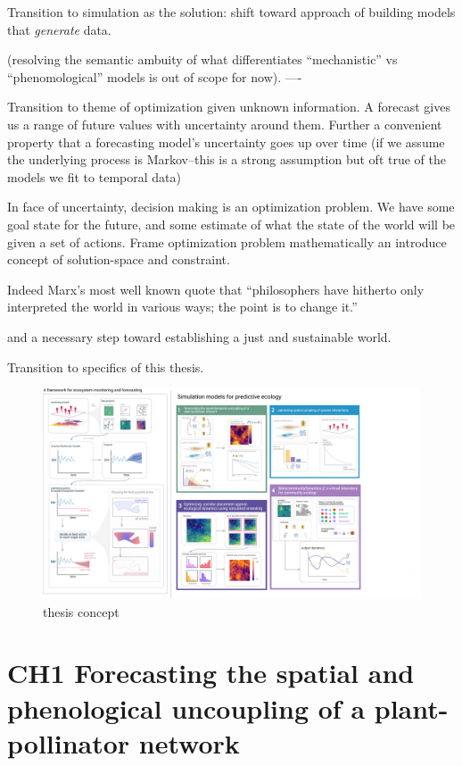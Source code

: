 \documentclass[10pt,oneside]{article}
\makeatletter
\def\maxwidth{\ifdim\Gin@nat@width>\linewidth\linewidth
\else\Gin@nat@width\fi}
\let\Oldincludegraphics\includegraphics
\renewcommand{\includegraphics}[1]{\Oldincludegraphics[width=\maxwidth]{#1}}
\makeatother
\begin{document}
Transition to simulation as the solution: shift toward approach of
building models that \emph{generate} data.

(resolving the semantic ambuity of what differentiates ``mechanistic''
vs ``phenomological'' models is out of scope for now). ----

Transition to theme of optimization given unknown information. A
forecast gives us a range of future values with uncertainty around them.
Further a convenient property that a forecasting model's uncertainty
goes up over time (if we assume the underlying process is Markov--this
is a strong assumption but oft true of the models we fit to temporal
data)

In face of uncertainty, decision making is an optimization problem. We
have some goal state for the future, and some estimate of what the state
of the world will be given a set of actions. Frame optimization problem
mathematically an introduce concept of solution-space and constraint.

Indeed Marx's most well known quote that ``philosophers have hitherto
only interpreted the world in various ways; the point is to change it.''

and a necessary step toward establishing a just and sustainable world.

Transition to specifics of this thesis.

\begin{figure}
\centering
\includegraphics{./figures/thesisconcept.png}
\caption{thesis concept}
\end{figure}

\hypertarget{ch1-forecasting-the-spatial-and-phenological-uncoupling-of-a-plant-pollinator-network}{%
\section{CH1 Forecasting the spatial and phenological uncoupling of a
plant-pollinator
network}\label{ch1-forecasting-the-spatial-and-phenological-uncoupling-of-a-plant-pollinator-network}}
\end{document}
